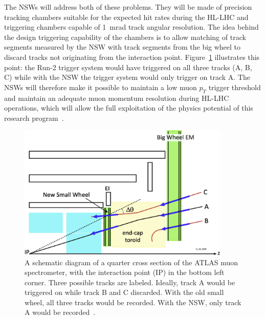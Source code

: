 The NSWs will address both of these problems. They will be made of precision tracking chambers suitable for the expected hit rates during the HL-LHC and triggering chambers capable of \SI{1}{mrad} track angular resolution. The idea behind the design triggering capability of the chambers is to allow matching of track segments measured by the NSW with track segments from the big wheel to discard tracks not originating from the interaction point. Figure~\ref{fig:nsw_track_triggering} illustrates this point: the Run-2 trigger system would have triggered on all three tracks (A, B, C) while with the NSW the trigger system would only trigger on track A. The NSWs will therefore make it possible to maintain a low muon $p_T$ trigger threshold and maintain an adequate muon momentum resolution during HL-LHC operations, which will allow the full exploitation of the physics potential of this research program~\cite{nsw_tdr}.

\begin{figure}
    \centering
    \includegraphics[width = 0.9\textwidth]{figures/perez-codina_NSW_tracks.jpg}
    \caption{A schematic diagram of a quarter cross section of the ATLAS muon spectrometer, with the interaction point (IP) in the bottom left corner. Three possible tracks are labeled. Ideally, track A would be triggered on while track B and C discarded. With the old small wheel, all three tracks would be recorded. With the NSW, only track A would be recorded~\cite{nsw_tdr}.}
    \label{fig:nsw_track_triggering}
\end{figure}

